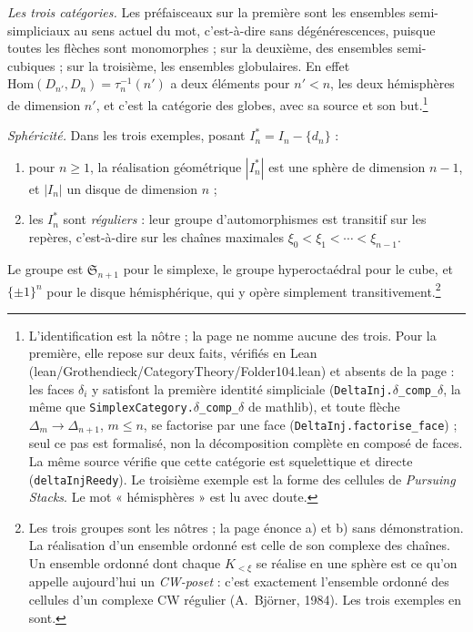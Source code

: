 \documentclass[11pt,a4paper]{article}
\begin{document}
\emph{Les trois catégories.} Les préfaisceaux sur la première sont
les ensembles semi-simpliciaux au sens actuel du mot, c'est-à-dire sans
dégénérescences, puisque toutes les flèches sont monomorphes ; sur la deuxième, des ensembles semi-cubiques ; sur
la troisième, les ensembles globulaires. En effet $\mathrm{Hom}(D_{n'}, D_{n})
= \tau_{n}^{-1}(n')$ a deux éléments pour $n' < n$, les deux hémisphères de
dimension $n'$, et c'est la catégorie des globes, avec sa source et son
but.\footnote{L'identification est la nôtre ; la page ne nomme aucune des
trois. Pour la première, elle repose sur deux faits, vérifiés en Lean
(lean/Grothendieck/CategoryTheory/Folder104.lean) et absents de la page : les faces
$\delta_{i}$ y satisfont la première identité simpliciale
(\texttt{DeltaInj.}$\delta$\texttt{\_comp\_}$\delta$, la même que \texttt{SimplexCategory.}$\delta$\texttt{\_comp\_}$\delta$
de mathlib), et toute flèche $\Delta_{m} \to \Delta_{n+1}$, $m \leq n$, se
factorise par une face (\texttt{DeltaInj.factorise\_face}) ; seul ce pas est
formalisé, non la décomposition complète en composé de faces. La même source
vérifie que cette catégorie est squelettique et directe
(\texttt{deltaInjReedy}). Le troisième exemple est la forme des cellules de \emph{Pursuing
Stacks}. Le mot « hémisphères » est lu avec doute.}

\emph{Sphéricité.} Dans les trois exemples, posant $I_{n}^{*} = I_{n} -
\{d_{n}\}$ :
\begin{enumerate}
\item[a)] pour $n \geq 1$, la réalisation géométrique $|I_{n}^{*}|$ est une
sphère de dimension $n - 1$, et $|I_{n}|$ un disque de dimension $n$ ;
\item[b)] les $I_{n}^{*}$ sont \emph{réguliers} : leur groupe d'automorphismes
est transitif sur les repères, c'est-à-dire sur les chaînes maximales
$\xi_{0} < \xi_{1} < \cdots < \xi_{n-1}$.
\end{enumerate}
Le groupe est $\mathfrak{S}_{n+1}$ pour le simplexe, le groupe hyperoctaédral
pour le cube, et $\{\pm 1\}^{n}$ pour le disque hémisphérique, qui y opère
simplement transitivement.\footnote{Les trois groupes sont les nôtres ; la page
énonce a) et b) sans démonstration. La réalisation d'un ensemble ordonné est
celle de son complexe des chaînes. Un ensemble ordonné dont chaque
$K_{< \xi}$ se réalise en une sphère est ce qu'on appelle aujourd'hui un
\emph{CW-poset} : c'est exactement l'ensemble ordonné des cellules d'un
complexe CW régulier (A.~Björner, 1984). Les trois exemples en sont.}
\end{document}
